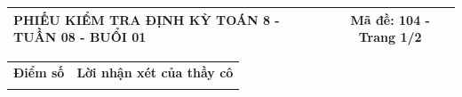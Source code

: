 \documentclass[12pt,a4paper]{article}
\begin{document}
\newpage
\noindent
\begin{tabularx}{\linewidth}{|X|c|}
\hline
\textbf{PHIẾU KIỂM TRA ĐỊNH KỲ TOÁN 8 - TUẦN 08 - BUỔI 01} & \textbf{Mã đề: 104 - Trang 1/2} \\
\hline
\end{tabularx}

\vspace{1.2mm}

\noindent
\begin{tabularx}{\linewidth}{|p{3.2cm}|X|}
\hline
\centering\textbf{Điểm số} & \centering\textbf{Lời nhận xét của thầy cô} \tabularnewline
\rule{0pt}{1.8cm} & \\
\hline
\end{tabularx}

\vspace{1.2mm}
\end{document}
